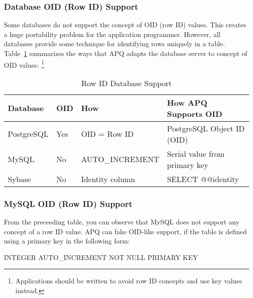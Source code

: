 \documentclass[english,letterpaper]{book}
\begin{document}
\subsubsection{Database OID (Row ID) Support}

Some databases do not support the concept of OID (row ID) values.
This creates a huge portability problem for the application programmer.
However, all databases provide some technique for identifying rows
uniquely in a table. Table~\ref{t:roids} summarizes the ways that
APQ adapts the database server to concept of OID values:%
\footnote{Applications should be written to avoid row ID concepts and use key values instead.}

\begin{table}
   \begin{center}
      \begin{tabular}{|l|l|l|l|}
         \hline 
         Database          &  OID      &  How               &  How APQ Supports OID\\
         \hline
         PostgreSQL        & Yes       &  OID = Row ID      &  PostgreSQL Object ID (OID)\\
         MySQL             & No        &  AUTO\_INCREMENT   &  Serial value from primary key\\
         Sybase            & No        &  Identity column   &  SELECT @@identity\\
         \hline
      \end{tabular}
   \end{center}
   \caption{Row ID Database Support}\label{t:roids}
\end{table}


\subsubsection{MySQL OID (Row ID) Support}

From the preceeding table, you can observe that MySQL does not support
any concept of a row ID value. APQ can fake OID-like support, if the
table is defined using a primary key in the following form:

\begin{SQL}

   INTEGER AUTO_INCREMENT NOT NULL PRIMARY KEY

\end{SQL}
\end{document}
